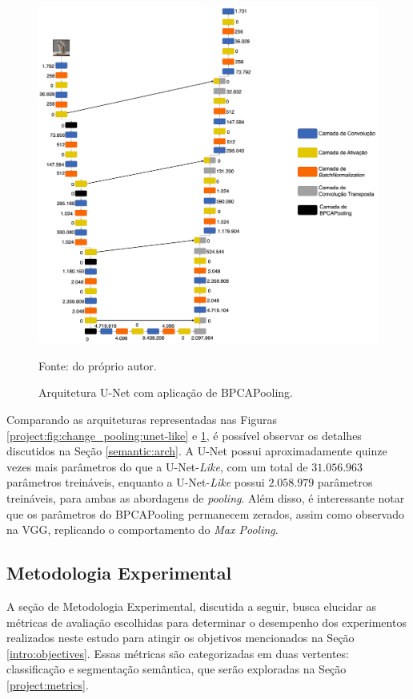 \begin{figure}[H]
    \centering
    \caption{Arquitetura U-Net com aplicação de BPCAPooling.}
    \includegraphics[width=1\textwidth]{recursos/imagens/project/unet-with-bpca.png}
    \label{project:fig:change_pooling:unet}

    Fonte: do próprio autor.
\end{figure}

Comparando as arquiteturas representadas nas Figuras \ref{project:fig:change_pooling:unet-like} e \ref{project:fig:change_pooling:unet}, é possível observar os detalhes discutidos na Seção \ref{semantic:arch}. A U-Net possui aproximadamente quinze vezes mais parâmetros do que a U-Net-\textit{Like}, com um total de $31.056.963$ parâmetros treináveis, enquanto a U-Net-\textit{Like} possui $2.058.979$ parâmetros treináveis, para ambas as abordagens de \textit{pooling}. Além disso, é interessante notar que os parâmetros do BPCAPooling permanecem zerados, assim como observado na VGG, replicando o comportamento do \textit{Max Pooling}.

\subsection{Metodologia Experimental}
\label{project:exp_result}
A seção de Metodologia Experimental, discutida a seguir, busca elucidar as métricas de avaliação escolhidas para determinar o desempenho dos experimentos realizados neste estudo para atingir os objetivos mencionados na Seção \ref{intro:objectives}. Essas métricas são categorizadas em duas vertentes: classificação e segmentação semântica, que serão exploradas na Seção \ref{project:metrics}.

